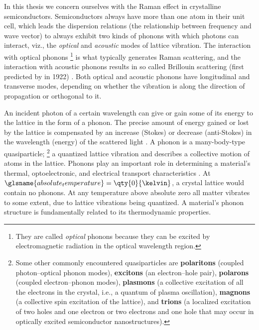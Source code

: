 \documentclass[webedition,openright,titles,swedish,english]{LuaUUThesis}\usepackage[]{graphicx}\usepackage[]{xcolor}
\newcommand{\ie}{i.e.}
\newcommand{\viz}{viz.}
\newcommand{\namely}{\viz}
\begin{document}
In this thesis we concern ourselves with the Raman effect in crystalline semiconductors.
Semiconductors always have more than one atom in their unit cell, which leads
the dispersion relations (the relationship between frequency and wave vector) to
always exhibit two kinds of phonons with which photons can interact, \namely,
the \emph{optical} and \emph{acoustic} modes of lattice vibration.
The interaction with optical phonons%
\footnote{
   They are called \emph{optical} phonons because they can be
   excited by electromagnetic radiation in the optical wavelength region.
}
is what typically generates Raman scattering, and
the interaction with acoustic phonons results in so called Brillouin scattering
(first predicted by \textcite{Brillouin1922} in 1922) \cite{Pankove1975}.
Both optical and acoustic phonons have longitudinal and transverse modes,
depending on whether the vibration is along the direction of propagation
or orthogonal to it.

An incident photon of a certain wavelength can give or gain some of its energy
to the lattice in the form of a phonon.
The precise amount of energy gained or lost by the lattice is compensated by
an increase (Stokes) or decrease (anti-Stokes) in the wavelength (energy) of
the scattered light \cite{Loudon1964,Pankove1975}.
A phonon is a many-body-type quasiparticle;%
\footnote{%
   Some other commonly encountered quasiparticles are
   \textbf{polaritons} (coupled photon--optical phonon modes),
   \textbf{excitons} (an electron--hole pair),
   \textbf{polarons} (coupled electron--phonon modes),
   \textbf{plasmons} (a collective excitation of all the electrons in the crystal, \ie, a quantum of plasma oscillation),
   \textbf{magnons} (a collective spin excitation of the lattice),
   and
   \textbf{trions} (a localized excitation of two holes and one electron or two electrons
   and one hole that may occur in optically excited semiconductor nanostructures).}
a quantized lattice vibration and describes a collective motion of atoms in the lattice.
Phonons play an important role in determining a material's thermal, optoelectronic,
and electrical transport characteristics \cite{Senga2019}.
At $\glsname{absolute_temperature}=\qty{0}{\kelvin}$, a crystal lattice would contain no phonons.
At any temperature above absolute zero all matter vibrates to some extent,
due to lattice vibrations being quantized.
A material's phonon structure is fundamentally related to its thermodynamic
properties.

%
\end{document}

